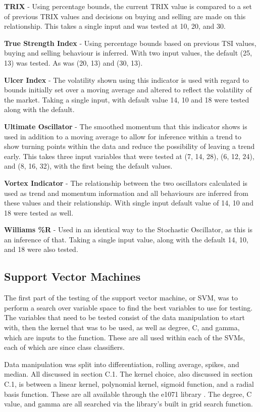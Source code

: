 \documentclass[conference]{IEEEtran}
\begin{document}
\textbf{TRIX} - Using percentage bounds, the current TRIX value is compared to a set of previous TRIX values and decisions on buying and selling are made on this relationship. This takes a single input and was tested at 10, 20, and 30. 

\textbf{True Strength Index} - Using percentage bounds based on previous TSI values, buying and selling behaviour is inferred. With two input values, the default (25, 13) was tested. As was (20, 13) and (30, 13).

\textbf{Ulcer Index} - The volatility shown using this indicator is used with regard to bounds initially set over a moving average and altered to reflect the volatility of the market. Taking a single input, with default value 14, 10 and 18 were tested along with the default.

\textbf{Ultimate Oscillator} - The smoothed momentum that this indicator shows is used in addition to a moving average to allow for inference within a trend to show turning points within the data and reduce the possibility of leaving a trend early. This takes three input variables that were tested at (7, 14, 28), (6, 12, 24), and (8, 16, 32), with the first being the default values.

\textbf{Vortex Indicator} - The relationship between the two oscillators calculated is used as trend and momentum information and all behaviours are inferred from these values and their relationship. With single input default value of 14, 10 and 18 were tested as well.

\textbf{Williams \%R} - Used in an identical way to the Stochastic Oscillator, as this is an inference of that. Taking a single input value, along with the default 14, 10, and 18 were also tested.

\subsection{Support Vector Machines}

The first part of the testing of the support vector machine, or SVM, was to perform a search over variable space to find the best variables to use for testing. The variables that need to be tested consist of the data manipulation to start with, then the kernel that was to be used, as well as degree, C, and gamma, which are inputs to the function. These are all used within each of the SVMs, each of which are since class classifiers. 

Data manipulation was split into differentiation, rolling average, spikes, and median. All discussed in section C.1. The kernel choice, also discussed in section C.1, is between a linear kernel, polynomial kernel, sigmoid function, and a radial basis function. These are all available through the e1071 library \cite{Meyer2017}. The degree, C value, and gamma are all searched via the library's built in grid search function. 
\end{document}

